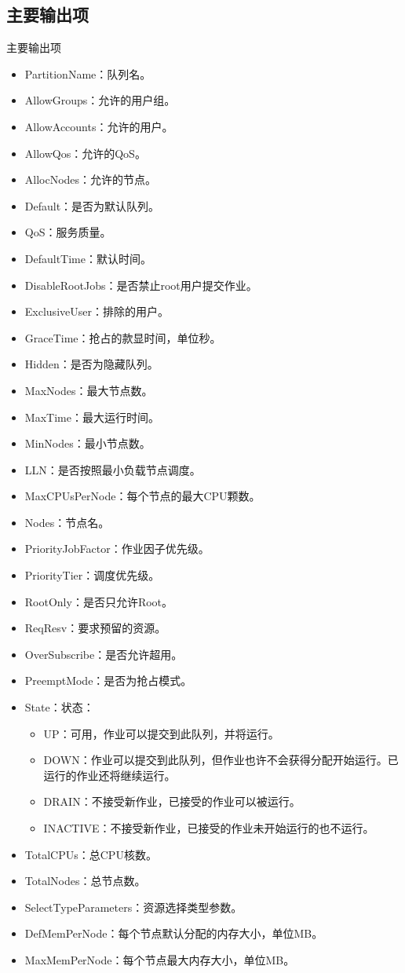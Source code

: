 \subsection{主要输出项}
\begin{frame}{主要输出项}
\begin{itemize}
	\item PartitionName：队列名。
	\item AllowGroups：允许的用户组。
	\item AllowAccounts：允许的用户。
	\item AllowQos：允许的QoS。
	\item AllocNodes：允许的节点。
	\item Default：是否为默认队列。
	\item QoS：服务质量。
	\item DefaultTime：默认时间。
	\item DisableRootJobs：是否禁止root用户提交作业。
	\item ExclusiveUser：排除的用户。
	\item GraceTime：抢占的款显时间，单位秒。
	\item Hidden：是否为隐藏队列。
	\item MaxNodes：最大节点数。
	\item MaxTime：最大运行时间。
	\item MinNodes：最小节点数。
	\item LLN：是否按照最小负载节点调度。
	\item MaxCPUsPerNode：每个节点的最大CPU颗数。
	\item Nodes：节点名。
	\item PriorityJobFactor：作业因子优先级。
	\item PriorityTier：调度优先级。
	\item RootOnly：是否只允许Root。
	\item ReqResv：要求预留的资源。
	\item OverSubscribe：是否允许超用。
	\item PreemptMode：是否为抢占模式。
	\item State：状态：
\begin{itemize}
	\item UP：可用，作业可以提交到此队列，并将运行。
   	\item DOWN：作业可以提交到此队列，但作业也许不会获得分配开始运行。已运行的作业还将继续运行。
   	\item DRAIN：不接受新作业，已接受的作业可以被运行。
   	\item INACTIVE：不接受新作业，已接受的作业未开始运行的也不运行。
\end{itemize}
	\item TotalCPUs：总CPU核数。
	\item TotalNodes：总节点数。
	\item SelectTypeParameters：资源选择类型参数。
	\item DefMemPerNode：每个节点默认分配的内存大小，单位MB。
	\item MaxMemPerNode：每个节点最大内存大小，单位MB。
\end{itemize}
\end{frame}

